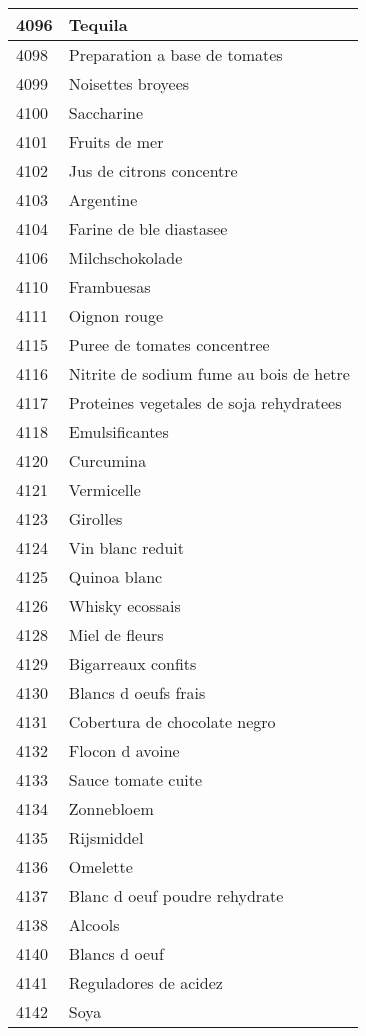 \begin{longtable}{|l|l|}
4096 & Tequila \\ \hline 
4098 & Preparation a base de tomates \\ \hline 
4099 & Noisettes broyees \\ \hline 
4100 & Saccharine \\ \hline 
4101 & Fruits de mer \\ \hline 
4102 & Jus de citrons concentre \\ \hline 
4103 & Argentine \\ \hline 
4104 & Farine de ble diastasee \\ \hline 
4106 & Milchschokolade \\ \hline 
4110 & Frambuesas \\ \hline 
4111 & Oignon rouge \\ \hline 
4115 & Puree de tomates concentree \\ \hline 
4116 & Nitrite de sodium fume au bois de hetre \\ \hline 
4117 & Proteines vegetales de soja rehydratees \\ \hline 
4118 & Emulsificantes \\ \hline 
4120 & Curcumina \\ \hline 
4121 & Vermicelle \\ \hline 
4123 & Girolles \\ \hline 
4124 & Vin blanc reduit \\ \hline 
4125 & Quinoa blanc \\ \hline 
4126 & Whisky ecossais \\ \hline 
4128 & Miel de fleurs \\ \hline 
4129 & Bigarreaux confits \\ \hline 
4130 & Blancs d oeufs frais \\ \hline 
4131 & Cobertura de chocolate negro \\ \hline 
4132 & Flocon d avoine \\ \hline 
4133 & Sauce tomate cuite \\ \hline 
4134 & Zonnebloem \\ \hline 
4135 & Rijsmiddel \\ \hline 
4136 & Omelette \\ \hline 
4137 & Blanc d oeuf poudre rehydrate \\ \hline 
4138 & Alcools \\ \hline 
4140 & Blancs d oeuf \\ \hline 
4141 & Reguladores de acidez \\ \hline 
4142 & Soya \\ \hline 

\end{longtable}
